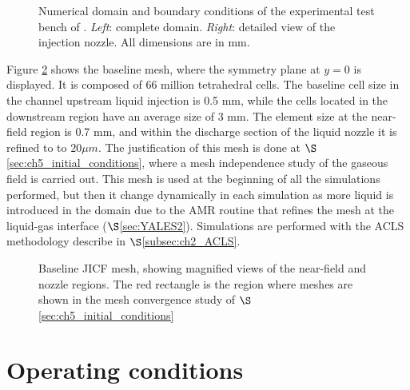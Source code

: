 \begin{figure}[ht]
     \centering
      \caption{Numerical domain and boundary conditions of the experimental test bench of . \textsl{Left}: complete domain. \textsl{Right}: detailed view of the injection nozzle. All dimensions are in mm.}
      \label{fig:numerical_setup_maquette_JICF_DLR}
\end{figure}

Figure \ref{fig:jicf_dlr_mesh} shows the baseline mesh, where the symmetry plane at $y = 0$ is displayed. It is composed of 66 million tetrahedral cells. The baseline cell size in the channel upstream liquid injection is 0.5 mm, while the cells located in the downstream region have an average size of 3 mm. The element size at the near-field region is 0.7 mm, and within the discharge section of the liquid nozzle it is refined to to $20 \mu m$. The justification of this mesh is done at $\S$\ref{sec:ch5_initial_conditions}, where a mesh independence study of the gaseous field is carried out. This mesh is used at the beginning of all the simulations performed, but then it change dynamically in each simulation as more liquid is introduced in the domain due to the AMR routine that refines the mesh at the liquid-gas interface ($\S$\ref{sec:YALES2}). Simulations are performed with the ACLS methodology describe in $\S$\ref{subsec:ch2_ACLS}.

\begin{figure}[h!]
	\centering
	\caption[Baseline JICF mesh, showing magnified views of the near-field and nozzle regions.]{Baseline JICF mesh, showing magnified views of the near-field and nozzle regions. The red rectangle is the region where meshes are shown in the mesh convergence study of $\S$\ref{sec:ch5_initial_conditions}}
	\label{fig:jicf_dlr_mesh}
\end{figure}



\section{Operating conditions}

